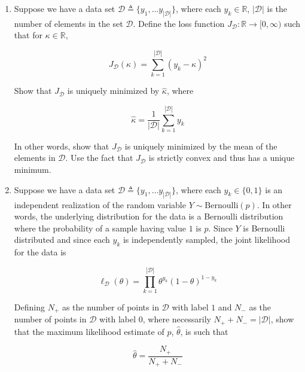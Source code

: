 \documentclass{article}
\numberwithin{equation}{section}
\begin{document}
\begin{enumerate}
    \item
    Suppose we have a data set $ \mathcal{D} \triangleq \{y_1,
    \ldots y_{|\mathcal{D}|}\} $, where each $ y_k \in \mathbb{R} $,
    $ |\mathcal{D}| $ is the number of elements in the set $ \mathcal{D} $.
    Define the loss function $ J_\mathcal{D} : \mathbb{R}
    \rightarrow [0, \infty) $ such that for $ \kappa \in \mathbb{R} $,

    \begin{equation*}
        J_\mathcal{D}(\kappa) = \sum_{k = 1}^{|\mathcal{D}|}(y_k - \kappa)^2
    \end{equation*}

    Show that $ J_\mathcal{D} $ is uniquely minimized by $ \hat{\kappa} $, where

    \begin{equation*}
        \hat{\kappa} = \frac{1}{|\mathcal{D}|}\sum_{k = 1}^{|\mathcal{D}|}y_k
    \end{equation*}

    In other words, show that $ J_\mathcal{D} $ is uniquely minimized by the
    mean of the elements in $ \mathcal{D} $. Use the fact that $ J_\mathcal{D} $
    is strictly convex and thus has a unique minimum.

    \item
    Suppose we have a data set $ \mathcal{D} \triangleq \{y_1, \ldots
    y_{|\mathcal{D}|}\} $, where each $ y_k \in \{0, 1\} $ is an independent
    realization of the random variable $ Y \sim \mathrm{Bernoulli}(p) $. In
    other words, the underlying distribution for the data is a Bernoulli
    distribution where the probability of a sample having value $ 1 $ is $ p $.
    Since $ Y $ is Bernoulli distributed and since each $ y_k $ is independently
    sampled, the joint likelihood for the data is

    \begin{equation*}
        \ell_\mathcal{D}(\theta) = \prod_{k = 1}^{|\mathcal{D}|}
        \theta^{y_k}(1 - \theta)^{1 - y_k}
    \end{equation*}

    Defining $ N_+ $ as the number of points in $ \mathcal{D} $ with label $ 1 $
    and $ N_- $ as the number of points in $ \mathcal{D} $ with label $ 0 $,
    where necessarily $ N_+ + N_- = |\mathcal{D}| $, show that the maximum
    likelihood estimate of $ p $, $ \hat{\theta} $, is such that

    \begin{equation*}
        \hat{\theta} = \frac{N_+}{N_+ + N_-}
    \end{equation*}


\end{enumerate}
\end{document}
